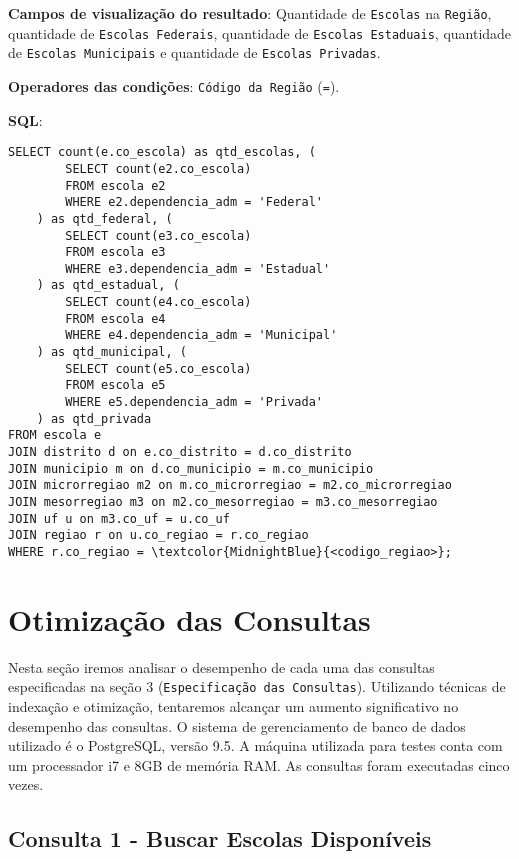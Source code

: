 \documentclass[12pt,a4paper]{article}
\begin{document}
\begin{enumerate}
        \textbf{Campos de visualização do resultado}: Quantidade de \texttt{Escolas} na \texttt{Região}, quantidade de \texttt{Escolas Federais}, quantidade de \texttt{Escolas Estaduais}, quantidade de \texttt{Escolas Municipais} e quantidade de \texttt{Escolas Privadas}.
        
        \textbf{Operadores das condições}: \texttt{Código da Região} (\texttt{=}).
        
        \textbf{SQL}:
        \begin{Verbatim}[commandchars=\\\{\}]
SELECT count(e.co_escola) as qtd_escolas, (
        SELECT count(e2.co_escola)
        FROM escola e2
        WHERE e2.dependencia_adm = 'Federal'
    ) as qtd_federal, (
        SELECT count(e3.co_escola)
        FROM escola e3
        WHERE e3.dependencia_adm = 'Estadual'
    ) as qtd_estadual, (
        SELECT count(e4.co_escola)
        FROM escola e4
        WHERE e4.dependencia_adm = 'Municipal'
    ) as qtd_municipal, (
        SELECT count(e5.co_escola)
        FROM escola e5
        WHERE e5.dependencia_adm = 'Privada'
    ) as qtd_privada
FROM escola e
JOIN distrito d on e.co_distrito = d.co_distrito
JOIN municipio m on d.co_municipio = m.co_municipio
JOIN microrregiao m2 on m.co_microrregiao = m2.co_microrregiao
JOIN mesorregiao m3 on m2.co_mesorregiao = m3.co_mesorregiao
JOIN uf u on m3.co_uf = u.co_uf
JOIN regiao r on u.co_regiao = r.co_regiao
WHERE r.co_regiao = \textcolor{MidnightBlue}{<codigo_regiao>};
        \end{Verbatim}
        
\end{enumerate}


\section{Otimização das Consultas}

Nesta seção iremos analisar o desempenho de cada uma das consultas especificadas na seção 3 (\texttt{Especificação das Consultas}). Utilizando técnicas de indexação e otimização, tentaremos alcançar um aumento significativo no desempenho das consultas.
O sistema de gerenciamento de banco de dados utilizado é o PostgreSQL, versão 9.5. A máquina utilizada para testes conta com um processador i7 e 8GB de memória RAM. As consultas foram executadas cinco vezes.

\subsection{Consulta 1 - Buscar Escolas Disponíveis}
\end{document}
